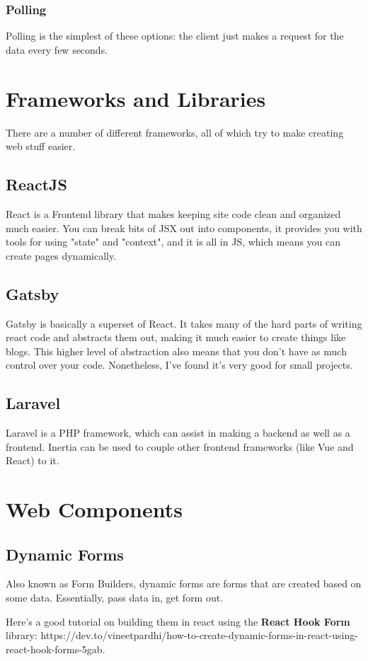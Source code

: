 \documentclass[a4paper,12pt,titlepage,oneside,final]{book}
\begin{document}
\subsection{Polling}
Polling is the simplest of these options: the client just makes a request for the data every few seconds.

\chapter{Frameworks and Libraries}

There are a number of different frameworks, all of which try to make creating web stuff easier.

\section{ReactJS}
React is a Frontend library that makes keeping site code clean and organized much easier. You can break bits of JSX out into components, it provides you with tools for using "state" and "context", and it is all in JS, which means you can create pages dynamically.  

\section{Gatsby}
Gatsby is basically a superset of React. It takes many of the hard parts of writing react code and abstracts them out, making it much easier to create things like blogs. This higher level of abstraction also means that you don't have as much control over your code. Nonetheless, I've found it's very good for small projects. 

\section{Laravel}
Laravel is a PHP framework, which can assist in making a backend as well as a frontend. Inertia can be used to couple other frontend frameworks (like Vue and React) to it.


\chapter{Web Components}

\section{Dynamic Forms}
Also known as Form Builders, dynamic forms are forms that are created based on some data. Essentially, pass data in, get form out. 

Here's a good tutorial on building them in react using the \textbf{React Hook Form} library: https://dev.to/vineetpardhi/how-to-create-dynamic-forms-in-react-using-react-hook-forms-5gab.
\end{document}
